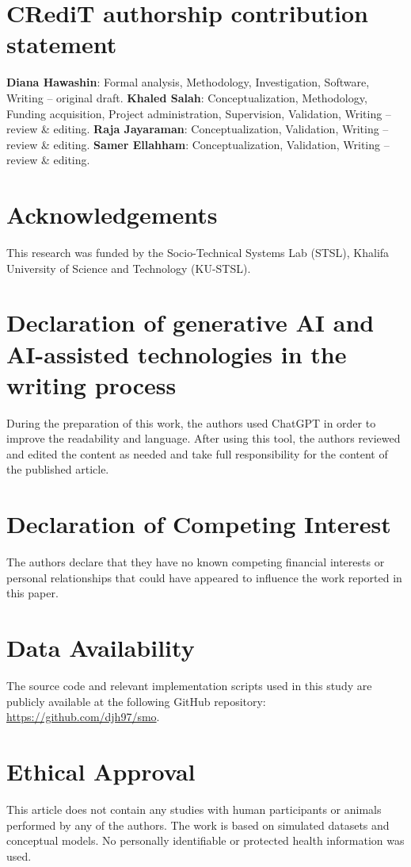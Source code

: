 \documentclass[preprint,12pt]{elsarticle}
\begin{document}
\section*{CRediT authorship contribution statement}

\textbf{Diana Hawashin}: Formal analysis, Methodology, Investigation, Software, Writing -- original draft. \textbf{Khaled Salah}: Conceptualization, Methodology, Funding acquisition, Project administration, Supervision, Validation, Writing -- review \& editing. \textbf{Raja Jayaraman}: Conceptualization, Validation, Writing -- review \& editing. \textbf{Samer Ellahham}: Conceptualization, Validation, Writing -- review \& editing.


\section*{Acknowledgements}
This research was funded by the Socio-Technical Systems Lab (STSL), Khalifa University of Science and Technology (KU-STSL). 

\section*{Declaration of generative AI and AI-assisted technologies in the writing process}
During the preparation of this work, the authors used ChatGPT in order to improve the readability and language. After using this tool, the authors reviewed and edited the content as needed and take full responsibility for the content of the published article.

\section*{Declaration of Competing Interest}
The authors declare that they have no known competing financial interests or personal relationships that could have appeared to influence the work reported in this paper.

\section*{Data Availability}
The source code and relevant implementation scripts used in this study are publicly available at the following GitHub repository: \url{https://github.com/djh97/smo}.


\section*{Ethical Approval}
This article does not contain any studies with human participants or animals performed by any of the authors. The work is based on simulated datasets and conceptual models. No personally identifiable or protected health information was used.
\end{document}
